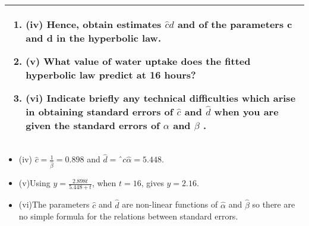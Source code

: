 \documentclass[a4paper,12pt]{article}
\begin{document}
\begin{table}[ht!]
 
\centering
 
\begin{tabular}{|p{15cm}|}
 
\hline  

\begin{enumerate}
\item (iv) Hence, obtain estimates $\hat{ c}d$ and of the parameters c and d in the hyperbolic law.
\item 
(v) What value of water uptake does the fitted hyperbolic law predict at 16 hours?
\item 
(vi) Indicate briefly any technical difficulties which arise in obtaining standard errors of $\hat{ c}$ and $\hat{ d}$ when you are given the standard errors of $\alpha$ and $\beta$ .
\end{enumerate}

\\ \hline
 
\end{tabular}

\end{table}

\newpage

\begin{itemize}
\item (iv) $ \displaystyle{  \hat{ c} = \frac{1} { \hat{ \beta} }  = 0.898 }$ and $\hat{ d} = ˆ c \hat{\alpha} = 5.448$.
\item (v)Using $ \displaystyle{ y = \frac{2.898t}{5.448+t} }$, when $t=16$, gives $y=2.16$.
\item 
(vi)The parameters $\hat{ c}$ and $\hat{ d}$ are non-linear functions of $\hat{\alpha}$ and $\hat{\beta}$ so there are no simple formula for the relations between standard errors.
\end{itemize}
\end{document}

